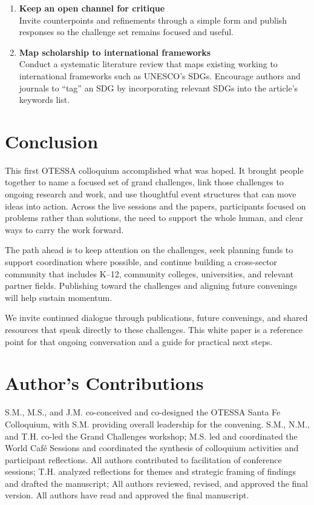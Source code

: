 \documentclass[
  letterpaper,
  DIV=11,
  numbers=noendperiod]{scrartcl}
\begin{document}
\begin{enumerate}
  courses using the checklist, and a short belonging or anxiety item.
\item
  \textbf{Keep an open channel for critique}\\
  Invite counterpoints and refinements through a simple form and publish
  responses so the challenge set remains focused and useful.
\item
  \textbf{Map scholarship to international frameworks}\\
  Conduct a systematic literature review that maps existing working to
  international frameworks such as UNESCO's SDGs. Encourage authors and
  journals to ``tag'' an SDG by incorporating relevant SDGs into the
  article's keywords list.
\end{enumerate}

\section{Conclusion}\label{conclusion}

This first OTESSA colloquium accomplished what was hoped. It brought
people together to name a focused set of grand challenges, link those
challenges to ongoing research and work, and use thoughtful event
structures that can move ideas into action. Across the live sessions and
the papers, participants focused on problems rather than solutions, the
need to support the whole human, and clear ways to carry the work
forward.

The path ahead is to keep attention on the challenges, seek planning
funds to support coordination where possible, and continue building a
cross-sector community that includes K--12, community colleges,
universities, and relevant partner fields. Publishing toward the
challenges and aligning future convenings will help sustain momentum.

We invite continued dialogue through publications, future convenings,
and shared resources that speak directly to these challenges. This white
paper is a reference point for that ongoing conversation and a guide for
practical next steps.

\section{Author's Contributions}\label{authors-contributions}

S.M., M.S., and J.M. co-conceived and co-designed the OTESSA Santa Fe
Colloquium, with S.M. providing overall leadership for the convening.
S.M., N.M., and T.H. co-led the Grand Challenges workshop; M.S. led and
coordinated the World Café Sessions and coordinated the synthesis of
colloquium activities and participant reflections. All authors
contributed to facilitation of conference sessions; T.H. analyzed
reflections for themes and strategic framing of findings and drafted the
manuscript; All authors reviewed, revised, and approved the final
version. All authors have read and approved the final manuscript.
\end{document}
